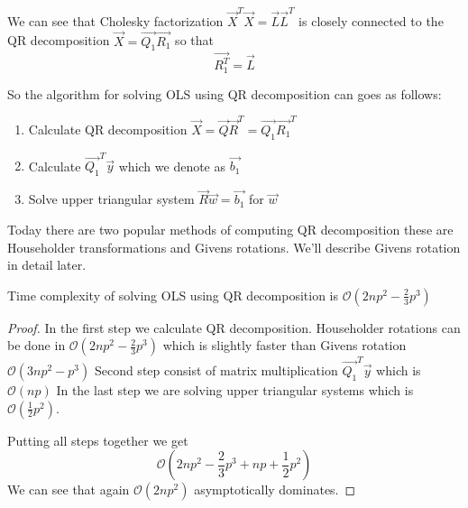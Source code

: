 \begin{note}
		We can see that Cholesky factorization  $\vec{X}^T\vec{X} = \vec{L}\vec{L}^T$ is closely connected to the QR decomposition $\vec{X} = \vec{Q_1}\vec{R_1}$ so that  
		\begin{equation}
				\vec{R_1^T} = \vec{L}
			\end{equation}
\end{note}

So the algorithm for solving OLS using QR decomposition can goes as follows:
\begin{enumerate}
  \item Calculate QR decomposition $\vec{X} = \vec{Q}\vec{R}^T = \vec{Q_1}\vec{R_1}^T$ 
  \item Calculate $\vec{Q_1}^T \vec{y}$ which we denote as $\vec{b_1}$ 
  \item Solve upper triangular system $	\vec{R}\vec{w} = \vec{b_1}$ for $\vec{w}$
\end{enumerate}

Today there are two popular methods of computing QR decomposition these are Householder transformations and Givens rotations. We'll describe Givens rotation in detail later. 
\begin{observation}
	Time complexity of solving OLS using QR decomposition is $\mathcal{O}(2np^2 - \frac{2}{3}p^3)$
\end{observation}
\begin{proof}
	
	In the first step we calculate QR decomposition. Householder rotations can be done in $\mathcal{O}(2np^2 - \frac{2}{3}p^3)$   which is slightly faster than Givens rotation $\mathcal{O}(3np^2 - p^3)$ 
	Second step consist of matrix multiplication $\vec{Q_1}^T \vec{y}$ which is $\mathcal{O}(np)$
	In the last step we are solving upper triangular systems which is
	 $\mathcal{O}(\frac{1}{2}p^2)$.

	Putting all steps together we get  
	\begin{equation} \label{timewholeQR}
		\mathcal{O}(2np^2 - \frac{2}{3}p^3 + np + \frac{1}{2}p^2)
	\end{equation}
	We can see that again $\mathcal{O}(2np^2)$ asymptotically dominates.
\end{proof}


